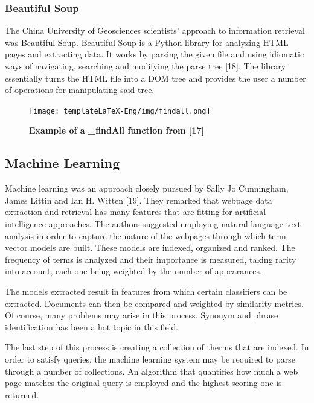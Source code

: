 \documentclass[12pt,a4paper,twoside]{report}
\begin{document}
\subsubsection{Beautiful Soup}
The China University of Geosciences scientists' approach to information retrieval was Beautiful Soup. Beautiful Soup is a Python library for analyzing HTML pages and extracting data. It works by parsing the given file and using idiomatic ways of navigating, searching and modifying the parse tree [18]. The library essentially turns the HTML file into a DOM tree and provides the user a number of operations for manipulating said tree. 

\begin{figure}[H]
    \begin{center}
        \texttt{[image: templateLaTeX-Eng/img/findall.png]}
        \caption{\bf Example of a \_findAll function from [17]}
    \end{center}
\end{figure}

\subsection{Machine Learning}

 Machine learning was an approach closely pursued by Sally Jo Cunningham, James Littin and Ian H. Witten [19]. They remarked that webpage data extraction and retrieval has many features that are fitting for artificial intelligence approaches. The authors suggested employing natural language text analysis in order to capture the nature of the webpages through which term vector models are built. These models are indexed, organized and ranked. The frequency of terms is analyzed and their importance is measured, taking rarity into account, each one being weighted by the number of appearances.
 
 The models extracted result in features from which certain classifiers can be extracted. Documents can then be compared and weighted by similarity metrics. Of course, many problems may arise in this process. Synonym and phrase identification has been a hot topic in this field.
 
 The last step of this process is creating a collection of therms that are indexed. In order to satisfy queries, the machine learning system may be required to parse through a number of collections. An algorithm that quantifies how much a web page matches the original query is employed and the highest-scoring one is returned.
 
\end{document}
